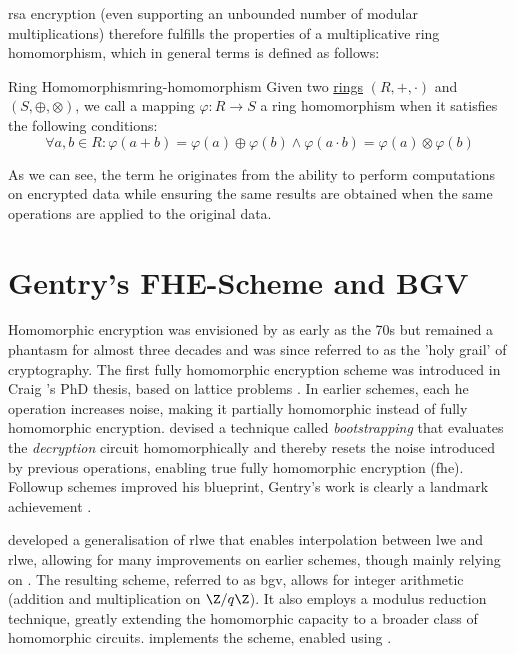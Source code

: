 \gls{rsa} encryption (even supporting an unbounded number of modular multiplications) therefore fulfills the properties of a multiplicative ring homomorphism, which in general terms is defined as follows:

\begin{definition}{Ring Homomorphism}{ring-homomorphism}
  Given two \hyperref[def:ring]{rings} $(R, +, \cdot)$ and $(S, \oplus, \otimes)$, we call a mapping $\varphi: R \rightarrow S$ a ring homomorphism when it satisfies the following conditions:
  $$\forall a, b \in R: \varphi(a + b) = \varphi(a) \oplus \varphi(b) \wedge \varphi(a \cdot b) = \varphi(a) \otimes \varphi(b)$$
\end{definition}

As we can see, the term \glsdesc{he} originates from the ability to perform computations on encrypted data while ensuring the same results are obtained when the same operations are applied to the original data.

\section{Gentry's FHE-Scheme and BGV}
Homomorphic encryption was envisioned by \citeauthor{1978-he-envisioned} as early as the 70s but remained a phantasm for almost three decades and was since referred to as the 'holy grail' of cryptography.
The first fully homomorphic encryption scheme was introduced in Craig 's PhD thesis, based on lattice problems \parencite{2009-gentry-fhe-original}.
In earlier schemes, each \gls{he} operation increases noise, making it partially homomorphic instead of fully homomorphic encryption.
 devised a technique called \textit{bootstrapping} that evaluates the \textit{decryption} circuit homomorphically and thereby resets the noise introduced by previous operations, enabling true fully homomorphic encryption (\gls{fhe}).
Followup schemes improved his blueprint, Gentry's work is clearly a landmark achievement \parencite{2010-first-glimpse-of-fhe}.

\cite{2012-bgv-original} developed a generalisation of \gls{rlwe} that enables interpolation between \gls{lwe} and \gls{rlwe}, allowing for many improvements on earlier schemes, though mainly relying on \cite{2009-gentry-fhe-original}.
The resulting scheme, referred to as \gls{bgv}, allows for integer arithmetic (addition and multiplication on $\Z/q\Z$). It also employs a modulus reduction technique, greatly extending the homomorphic capacity to a broader class of homomorphic circuits.
\cite{seal-4.0} implements the scheme, enabled using .

